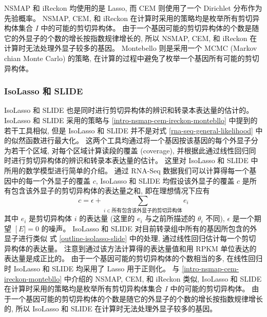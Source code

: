 NSMAP 和 iReckon 均使用的是 Lasso, 
而 CEM 则使用了一个 Dirichlet 分布作为先验概率。
NSMAP, CEM, 和 iReckon 在计算时采用的策略均是枚举所有剪切异构体集合 $I$ 中的可能的剪切异构体。 
由于一个基因可能的剪切异构体的个数是随它的外显子的个数的增长按指数规律增长的, 
所以 NSMAP, CEM, 和 iReckon 在计算时无法处理外显子较多的基因。 
Montebello 则是采用一个 MCMC (Markov chian Monte Carlo) \cite{robert2004monte} 的策略, 
在计算的过程中避免了枚举一个基因所有可能的剪切异构体。 

\subsubsection{IsoLasso 和 SLIDE}
IsoLasso 和 SLIDE 也是同时进行剪切异构体的辨识和转录本表达量的估计的。 
IsoLasso 和 SLIDE 采用的策略与 \ref{intro-nsmap-cem-ireckon-montebllo} 
中提到的若干工具相似, 但是 IsoLasso 和 SLIDE 并不是对式 
\eqref{rna-seq-general-likelihood} 中的似然函数进行最大化。 
这两个工具均通过将一个基因按该基因的每个外显子分为若干个区域, 
对每个区域计算读段的覆盖 (coverage), 
并根据此通过线性回归同时进行剪切异构体的辨识和转录本表达量的估计。 
这里对 IsoLasso 和 SLIDE 中所用的数学模型进行简单的介绍。 
通过 RNA-Seq 数据我们可以计算得每一个基因中的每一个外显子的覆盖 $c$, 
IsoLasso 和 SLIDE 均假设该外显子的覆盖 $c$ 是所有包含该外显子的剪切异构体的表达量之和, 
即在理想情况下应有
\begin{equation}
\label{outline-isolasso-slide}
c = \epsilon + \sum_{i \in \text{所有包含该外显子的剪切异构体}} e_i
\end{equation}
其中 $e_i$ 是剪切异构体 $i$ 的表达量 (这里的 $e_i$ 与之前所描述的 $\theta_i$ 不同), 
$\epsilon$ 是一个期望 $\operatorname[E] = 0$ 的噪声。 
IsoLasso 和 SLIDE 对目前转录组中所有的基因所包含的外显子进行类似 
式 \eqref{outline-isolasso-slide} 中的处理, 通过线性回归估计每一个剪切异构体的表达量。 
注意到通过该方法计算得的表达量值和用 RPKM 单位表达的表达量是成正比的。 
由于一个基因可能的剪切异构体的个数相当的多, 
在线性回归时 IsoLasso 和 SLIDE 均采用了 Lasso \cite{tibshirani1996regression} 用于正则化。 
与 \ref{intro-nsmap-cem-ireckon-montebllo} 中介绍的 NSMAP, CEM, 和 iReckon 类似, 
IsoLasso 和 SLIDE 在计算时采用的策略均是枚举所有剪切异构体集合 $I$ 中的可能的剪切异构体。 
由于一个基因可能的剪切异构体的个数是随它的外显子的个数的增长按指数规律增长的, 
所以 IsoLasso 和 SLIDE 在计算时无法处理外显子较多的基因。 











